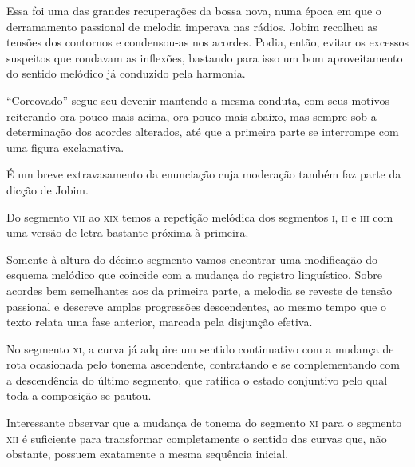 Essa foi uma das grandes recuperações da bossa nova, numa época em que o
derramamento passional de melodia imperava nas rádios. Jobim recolheu as
tensões dos contornos e condensou-as nos acordes. Podia, então, evitar
os excessos suspeitos que rondavam as inflexões, bastando para isso um
bom aproveitamento do sentido melódico já conduzido pela harmonia.

``Corcovado'' segue seu devenir mantendo a mesma conduta, com seus motivos
reiterando ora pouco mais acima, ora pouco mais abaixo, mas sempre sob a
determinação dos acordes alterados, até que a primeira parte se
interrompe com uma figura exclamativa.


É um breve extravasamento da enunciação cuja moderação também faz parte
da dicção de Jobim.

Do segmento \textsc{vii} ao \textsc{xix} temos a repetição melódica dos segmentos \textsc{i}, \textsc{ii} e \textsc{iii} com
uma versão de letra bastante próxima à primeira.

Somente à altura do décimo segmento vamos encontrar uma modificação do
esquema melódico que coincide com a mudança do registro linguístico.
Sobre acordes bem semelhantes aos da primeira parte, a melodia se
reveste de tensão passional e descreve amplas progressões descendentes,
ao mesmo tempo que o texto relata uma fase anterior, marcada pela
disjunção efetiva.


No segmento \textsc{xi}, a curva já adquire um sentido continuativo com a mudança
de rota ocasionada pelo tonema ascendente, contratando e se
complementando com a descendência do último segmento, que ratifica o
estado conjuntivo pelo qual toda a composição se pautou.


Interessante observar que a mudança de tonema do segmento \textsc{xi} para o
segmento \textsc{xii} é suficiente para transformar completamente o sentido das
curvas que, não obstante, possuem exatamente a mesma sequência inicial.

